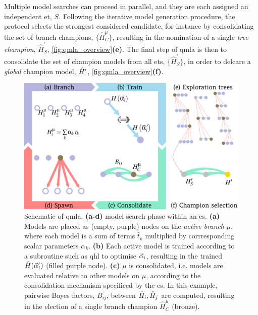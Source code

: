 Multiple model searches can proceed in parallel, and they are each assigned an independent \gls{et}, $S$. 
Following the iterative model generation procedure, the protocol selects the strongest considered candidate,
    for instance by consolidating the set of branch champions, $\{\hat{H}_C^{\mu} \}$,
    resulting in the nomination of a single \emph{tree champion}, $\hat{H}_{S}^{\prime}$, \cref{fig:qmla_overview}\textbf{(e)}.
The final step of \gls{qmla} is then to consolidate the set of champion models from all \glspl{et}, $\{\hat{H}_{S}^{\prime} \}$, 
    in order to delcare a \emph{global} \gls{champion model}, $\hat{H}^{\prime}$, \cref{fig:qmla_overview}\textbf{(f)}. 

\begin{figure}[t!]
    \begin{center}
        \includegraphics{algorithms/figures/overview.jpg}
    \end{center}
    \caption[Quantum Model Learning Agent overview]{
        Schematic of \acrfull{qmla}. 
        \textbf{(a-d)} \Gls{model search} phase within an \acrfull{es}.
        \textbf{(a)} Models are placed as (empty, purple) nodes on the \emph{active branch} $\mu$, 
            where each model is a sum of terms $\hat{t}_k$ multiplied by corrresponding scalar parameters $\alpha_k$. 
        \textbf{(b)} Each active model is trained according to a subroutine such as 
            \acrlong{qhl} to optimise $\vec{\alpha}_i$, 
            resulting in the trained $\hat{H}(\vec{\alpha}_i^{\prime})$ (filled purple node). 
        \textbf{(c)} $\mu$ is consolidated, i.e. models are evaluated relative to other
            models on $\mu$, according to the consolidation mechanism specificed by the \gls{es}.
            In this example, pairwise Bayes factors, $B_{ij}$, between $\hat{H}_i, \hat{H}_j$ are computed, 
            resulting in the election of a single branch champion $\hat{H}_C^{\mu}$ (bronze). 
}
\end{figure}
